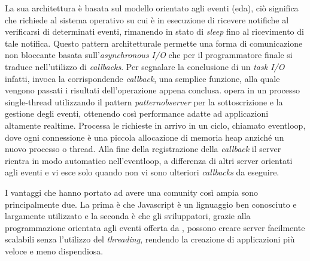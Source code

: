 La sua architettura è basata sul modello orientato agli eventi (\acrshort{eda}), ciò significa che \nodejs richiede al sistema operativo su cui è in esecuzione di ricevere notifiche al verificarsi di determinati eventi, rimanendo in stato di \textit{sleep} fino al ricevimento di tale notifica. Questo pattern architetturale permette una forma di comunicazione non bloccante basata sull'\textit{asynchronous I/O} che per il programmatore finale si traduce nell'utilizzo di \textit{callbacks}. Per segnalare la conclusione di un \textit{task I/O} infatti, \nodejs invoca la corrispondende \textit{callback}, una semplice funzione, alla quale vengono passati i risultati dell'operazione appena conclusa.
\nodejs opera in un processo single-thread utilizzando il pattern \textit{\acrshort{patternobserver}} per la sottoscrizione e la gestione degli eventi, ottenendo così performance adatte ad applicazioni altamente realtime. Processa le richieste in arrivo in un ciclo, chiamato \acrshort{eventloop}, dove ogni connessione è una piccola allocazione di memoria heap anziché un nuovo processo o thread. Alla fine della registrazione della \textit{callback} il server rientra in modo automatico nell'\acrshort{eventloop}, a differenza di altri server orientati agli eventi e vi esce solo quando non vi sono ulteriori \textit{callbacks} da eseguire.

I vantaggi che hanno portato \nodejs ad avere una comunity così ampia sono principalmente due. La prima è che Javascript è un lignuaggio ben conosciuto e largamente utilizzato e la seconda è che gli sviluppatori, grazie alla programmazione orientata agli eventi offerta da \nodejs, possono creare server facilmente scalabili senza l'utilizzo del \textit{threading}, rendendo la creazione di applicazioni più veloce e meno dispendiosa.

\subsection{\expressjs}
\subsection{\mongodb}
\subsection{\angular}